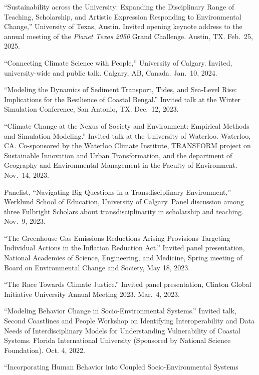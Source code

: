 %
%
\item ``Sustainability across the University: Expanding the Disciplinary Range of Teaching, Scholarship, and 
  Artistic Expression Responding to Environmental Change,'' 
  University of Texas, Austin. 
  Invited opening keynote address to the annual meeting of the \emph{Planet Texas 2050\/} Grand Challenge.
  Austin, TX. Feb.~25, 2025.
\item ``Connecting Climate Science with People,'' University of Calgary. 
  Invited, university-wide and public talk. 
  Calgary, AB, Canada. Jan.~10, 2024.
\item ``Modeling the Dynamics of Sediment Transport, Tides, and Sea-Level Rise: Implications for the Resilience of Coastal Bengal.'' Invited talk at the Winter Simulation Conference, San Antonio, TX. Dec.~12, 2023.
\item ``Climate Change at the Nexus of Society and Environment: Empirical Methods and Simulation Modeling.''
  Invited talk at the University of Waterloo. Waterloo, CA.
  Co-sponsored by the Waterloo Climate Institute, TRANSFORM project on Sustainable Innovation and Urban Transformation, and the department of Geography and Environmental Management in the Faculty of Environment.
  Nov.~14, 2023.
\item Panelist, ``Navigating Big Questions in a Transdisciplinary Environment,'' Werklund
  School of Education, University of Calgary. Panel discussion among three Fulbright
  Scholars about transdisciplinarity in scholarship and teaching.
  Nov.~9, 2023.
\item ``The Greenhouse Gas Emissions Reductions Arising Provisions Targeting
        Individual Actions in the Inflation Reduction Act.''
   Invited panel presentation, National Academies of Science, Engineering,
   and Medicine, Spring meeting of Board on Environmental Change and
   Society, May 18, 2023.
\item ``The Race Towards Climate Justice.''
   Invited panel presentation, Clinton Global Initiative University
   Annual Meeting 2023. Mar.~4, 2023.
\item ``Modeling Behavior Change in Socio-Environmental Systems.''
   Invited talk, Second Coastlines and People Workshop on Identifying Interoperability and Data Needs of Interdisciplinary Models for
   Understanding Vulnerability of Coastal Systems. Florida International
   University (Sponsored by National Science Foundation). Oct. 4, 2022.
\item ``Incorporating Human Behavior into Coupled Socio-Environmental Systems

